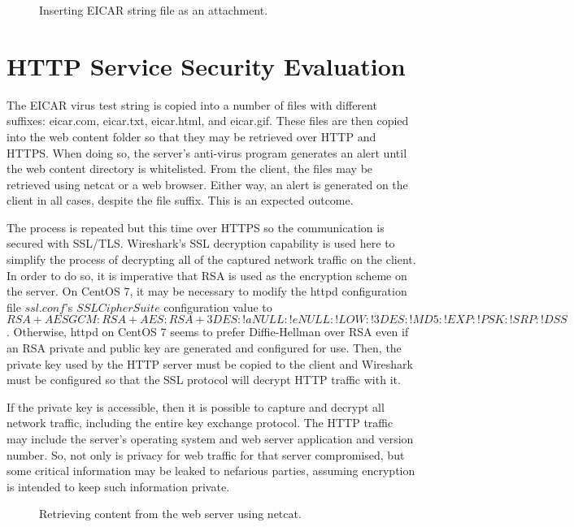 \documentclass[10pt,conference]{IEEEtran}
\begin{document}
\begin{figure}
\begin{mdframed}

\caption{Inserting EICAR string file as an attachment.}
\label{fig:attachment}
\end{mdframed}
\end{figure}

\section{HTTP Service Security Evaluation}
The EICAR virus test string is copied into a number of files with different suffixes: eicar.com, 
eicar.txt, eicar.html, and eicar.gif. These files are then copied into the web content folder so
that they may be retrieved over HTTP and HTTPS. When doing so, the server's anti-virus 
program generates an alert until the web content directory is whitelisted. From the client, the files may be retrieved
using netcat or a web browser.  Either way, an alert is generated on the client in all cases, despite
the file suffix.  This is an expected outcome.

The process is repeated but this time over HTTPS so the communication is secured with SSL/TLS.
Wireshark's SSL decryption capability is used here to simplify the process of decrypting all of
the captured network traffic on the client. In order to do so, it is imperative that RSA is used
as the encryption scheme on the server. On CentOS 7, it may be necessary to modify the httpd configuration
file $ssl.conf$'s $SSLCipherSuite$ configuration value to $RSA+AESGCM:RSA+AES:RSA+3DES:!aNULL:!eNULL:!LOW:!3DES:!MD5:!EXP:!PSK:!SRP:!DSS$.
Otherwise, httpd on CentOS 7 seems to prefer Diffie-Hellman over RSA even if an RSA private and public
key are generated and configured for use. Then, the private key used by the HTTP server must be copied 
to the client and Wireshark must be configured so that the SSL protocol will decrypt HTTP traffic with it.

If the private key is accessible, then it is possible to capture and decrypt all network traffic, including the entire key exchange protocol.
The HTTP traffic may include the server's operating system and web server application and version number. So, not only
is privacy for web traffic for that server compromised, but some critical information may be leaked to nefarious parties, 
assuming encryption is intended to keep such information private.

\begin{figure}
\begin{mdframed}

\caption{Retrieving content from the web server using netcat.}
\label{fig:attachment}
\end{mdframed}
\end{figure}
\end{document}
